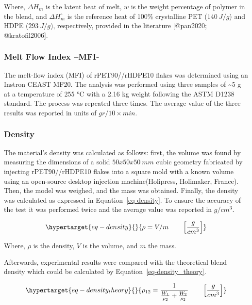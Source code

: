 \documentclass[
  letterpaper,
  DIV=11,
  numbers=noendperiod]{scrartcl}
\begin{document}
Where, \(\Delta H_{m}\) is the latent heat of melt, \(w\) is the weight
percentage of polymer in the blend, and \(\Delta H_{m}^\circ\) is the
reference heat of 100\% crystalline PET (\(140~J/g\)) and HDPE
(\(293~J/g\)), respectively, provided in the literature {[}@pan2020;
@kratofil2006{]}.

\hypertarget{melt-flow-index-mfi-}{%
\subsubsection{Melt Flow Index --MFI-}\label{melt-flow-index-mfi-}}

The melt-flow index (MFI) of rPET90//rHDPE10 flakes was determined using
an Instron CEAST MF20. The analysis was performed using three samples of
\textasciitilde5 g at a temperature of 255 °C with a 2.16 kg weight
following the ASTM D1238 standard. The process was repeated three times.
The average value of the three results was reported in units of
\(gr/10 \times min\).

\hypertarget{density}{%
\subsubsection{Density}\label{density}}

The material's density was calculated as follows: first, the volume was
found by measuring the dimensions of a solid \(50x50x50~mm\) cubic
geometry fabricated by injecting rPET90//rHDPE10 flakes into a square
mold with a known volume using an open-source desktop injection
machine(Holipress, Holimaker, France). Then, the model was weighed, and
the mass was obtained. Finally, the density was calculated as expressed
in Equation~\ref{eq-density}. To ensure the accuracy of the test it was
performed twice and the average value was reported in \(g/cm^{3}\).

\begin{equation}\protect\hypertarget{eq-density}{}{
\rho = V/m    \qquad \left[ \frac{g}{cm^{3}} \right]
}\label{eq-density}\end{equation}

Where, \(\rho\) is the density, \(V\) is the volume, and \(m\) the mass.

Afterwards, experimental results were compared with the theoretical
blend density which could be calculated by
Equation~\ref{eq-density_theory}.

\begin{equation}\protect\hypertarget{eq-density_theory}{}{
\rho_{12}= \frac{1}{\frac{W_{1}}{\rho_{2}} + \frac{W_{2}}{\rho_{2}}} \qquad \left[ \frac{g}{cm^{3}} \right]                                               
}\label{eq-density_theory}\end{equation}
\end{document}
